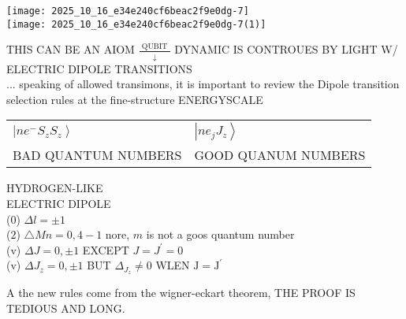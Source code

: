 \texttt{[image: 2025\_10\_16\_e34e240cf6beac2f9e0dg-7]}\\
\texttt{[image: 2025\_10\_16\_e34e240cf6beac2f9e0dg-7(1)]}

THIS CAN BE AN AIOM $\frac{\text { QUBIT }}{\downarrow}$ DYNAMIC IS CONTROUES BY LIGHT W/ ELECTRIC DIPOLE TRANSITIONS\\
... speaking of allowed transimons, it is important to review the Dipole transition selection rules at the fine-structure ENERGYSCALE

\begin{center}
\begin{tabular}{ll}
$\left|n e^{-} S_{z} S_{z}\right\rangle$ & $\left|n e_{j} J_{z}\right\rangle$ \\
BAD QUANTUM NUMBERS & GOOD QUANUM NUMBERS \\
\end{tabular}
\end{center}

HYDROGEN-LIKE\\
ELECTRIC DIPOLE\\
(0) $\Delta l= \pm 1$\\
(2) $\triangle M n=0,4-1$ nore, $m$ is not a goos quantum number\\
(v) $\Delta J=0, \pm 1$ EXCEPT $J=J^{\prime}=0$\\
(v) $\Delta J_{z}=0, \pm 1$ BUT $\Delta_{J_{z}} \neq 0$ WLEN $\mathrm{J}=\mathrm{J}^{\prime}$

A the new rules come from the wigner-eckart theorem, THE PROOF IS TEDIOUS AND LONG.

